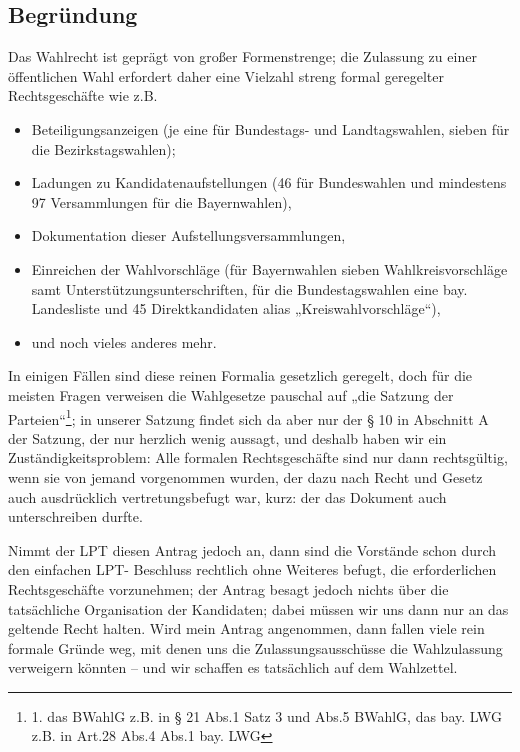 \subsection{Begründung}
Das Wahlrecht ist geprägt von großer Formenstrenge; die Zulassung zu einer öffentlichen Wahl
erfordert daher eine Vielzahl streng formal geregelter Rechtsgeschäfte wie z.B.
\begin{itemize}
	\item Beteiligungsanzeigen (je eine für Bundestags- und Landtagswahlen, sieben für die Bezirkstagswahlen);
	\item Ladungen zu Kandidatenaufstellungen (46 für Bundeswahlen und mindestens 97 Versammlungen für die Bayernwahlen),
	\item  Dokumentation dieser Aufstellungsversammlungen,
	\item Einreichen der Wahlvorschläge (für Bayernwahlen sieben Wahlkreisvorschläge samt Unterstützungsunterschriften, für die Bundestagswahlen eine bay. Landesliste und 45 Direktkandidaten alias „Kreiswahlvorschläge“),
	\item und noch vieles anderes mehr.
\end{itemize}
In einigen Fällen sind diese reinen Formalia gesetzlich geregelt, doch für die meisten Fragen verweisen
die Wahlgesetze pauschal auf „die Satzung der Parteien“\footnote{1. das BWahlG z.B. in § 21 Abs.1 Satz 3 und Abs.5 BWahlG, das bay. LWG z.B. in Art.28 Abs.4 Abs.1 bay. LWG}; in unserer Satzung findet sich da aber nur
der § 10 in Abschnitt A der Satzung, der nur herzlich wenig aussagt, und deshalb haben wir ein
Zuständigkeitsproblem: Alle formalen Rechtsgeschäfte sind nur dann rechtsgültig, wenn sie von
jemand vorgenommen wurden, der dazu nach Recht und Gesetz auch ausdrücklich vertretungsbefugt
war, kurz: der das Dokument auch unterschreiben durfte.


Nimmt der LPT diesen Antrag jedoch an, dann sind die Vorstände schon durch den einfachen LPT-
Beschluss rechtlich ohne Weiteres befugt, die erforderlichen Rechtsgeschäfte vorzunehmen; der Antrag
besagt jedoch nichts über die tatsächliche Organisation der Kandidaten; dabei müssen wir uns dann nur
an das geltende Recht halten. Wird mein Antrag angenommen, dann fallen viele rein formale Gründe
weg, mit denen uns die Zulassungsausschüsse die Wahlzulassung verweigern könnten – und wir
schaffen es tatsächlich auf dem Wahlzettel.
